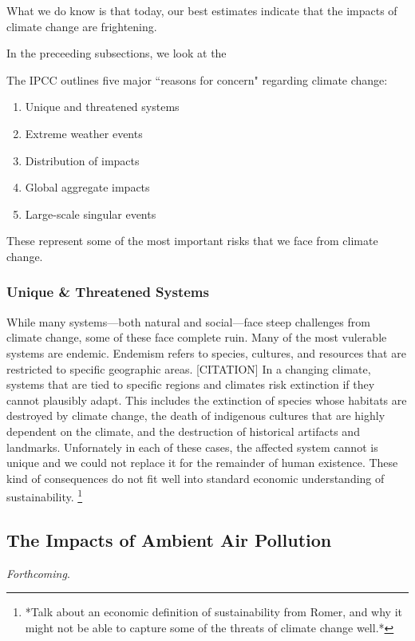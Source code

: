 What we do know is that today, our best estimates indicate that the impacts of climate change are frightening. 

In the preceeding subsections, we look at the

The IPCC outlines five major ``reasons for concern" regarding climate change:
\begin{enumerate}
	\item Unique and threatened systems
	\item Extreme weather events
	\item Distribution of impacts
	\item Global aggregate impacts
	\item Large-scale singular events
\end{enumerate}
These represent some of the most important risks that we face from climate change. 


\subsubsection*{Unique \& Threatened Systems}

While many systems---both natural and social---face steep challenges from climate change, some of these face complete ruin. Many of the most vulerable systems are endemic. Endemism refers to species, cultures, and resources that are restricted to specific geographic areas. [CITATION] In a changing climate, systems that are tied to specific regions and climates risk extinction if they cannot plausibly adapt. This includes the extinction of species whose habitats are destroyed by climate change, 
the death of indigenous cultures that are highly dependent on the climate, and the destruction of historical artifacts and landmarks. Unfornately in each of these cases, the affected system cannot is unique and we could not replace it for the remainder of human existence. These kind of consequences do not fit well into standard economic understanding of sustainability. \footnote{*Talk about an economic definition of sustainability from Romer, and why it might not be able to capture some of the threats of climate change well.*}


\subsection{The Impacts of Ambient Air Pollution}

\textit{Forthcoming}.


